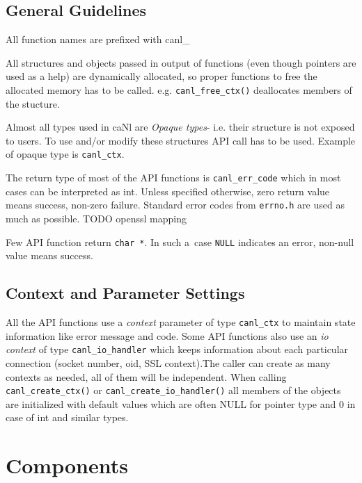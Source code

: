 \subsection{General Guidelines}

%
All function names are prefixed with canl\_

%
All structures and objects passed in output of functions
(even though pointers are used as a help)
are dynamically allocated, so proper functions to free the allocated 
memory has to be called. e.g. \verb'canl_free_ctx()' deallocates members
of the stucture.

%
Almost all types used in caNl are \textit{Opaque types}- i.e. their structure is 
not exposed to users. To use and/or modify these structures API call has 
to be used. Example of opaque type is \verb'canl_ctx'.

%
The return type of most of the API functions is \verb'canl_err_code' which
 in most cases can be interpreted as int. Unless specified otherwise, zero
return value means success, non-zero failure. Standard error codes from 
\verb'errno.h' are used as much as possible.
TODO openssl mapping

Few API function return \verb'char *'. In such a~case
\verb'NULL' indicates an error, non-null value means success.

\subsection{Context and Parameter Settings}
\label{s:context}
All the API functions use a \emph{context} parameter of type \verb'canl_ctx' 
to maintain state information like error message and code. 
Some API functions also use an \emph{io context} of type \verb'canl_io_handler'
which keeps information about each particular connection 
(\eg socket number, oid, SSL context).The caller can create as many 
contexts as needed, all of them will be independent. When calling
\verb'canl_create_ctx()' or \verb'canl_create_io_handler()' all members 
of the objects are initialized with default values which are often 
NULL for pointer type and 0 in case of int and similar types.

\section{\CANL Components}
\label{s:common}

